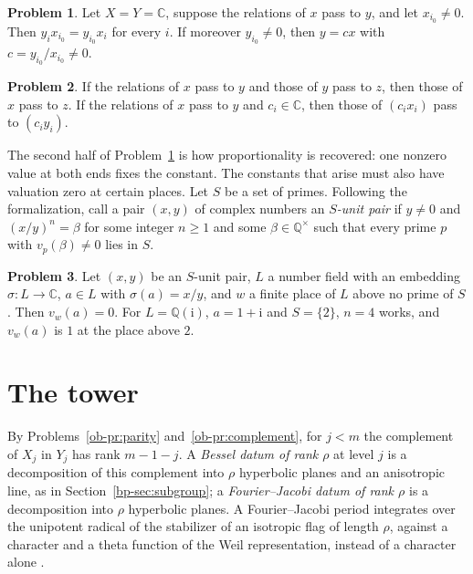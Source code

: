 \documentclass[reqno]{amsart}
\theoremstyle{definition}
\newtheorem{problem}{Problem}[section]
\theoremstyle{plain}
\theoremstyle{remark}
\newcommand{\Q}{\mathbb Q}
\newcommand{\C}{\mathbb C}
\begin{document}
\begin{problem}\label{pr:anchor}
Let \(X=Y=\C\), suppose the relations of \(x\) pass to \(y\), and let \(x_{i_0}\ne0\).  Then \(y_ix_{i_0}=y_{i_0}x_i\) for every \(i\).  If moreover \(y_{i_0}\ne0\), then \(y=cx\) with \(c=y_{i_0}/x_{i_0}\ne0\).
\end{problem}

\begin{problem}\label{pr:compose}
If the relations of \(x\) pass to \(y\) and those of \(y\) pass to \(z\), then those of \(x\) pass to \(z\).  If the relations of \(x\) pass to \(y\) and \(c_i\in\C\), then those of \((c_ix_i)\) pass to \((c_iy_i)\).
\end{problem}

The second half of Problem~\ref{pr:anchor} is how proportionality is recovered: one nonzero value at both ends fixes the constant.  The constants that arise must also have valuation zero at certain places.  Let \(S\) be a set of primes.  Following the formalization, call a pair \((x,y)\) of complex numbers an \emph{\(S\)-unit pair} if \(y\ne0\) and \((x/y)^n=\beta\) for some integer \(n\ge1\) and some \(\beta\in\Q^\times\) such that every prime \(p\) with \(v_p(\beta)\ne0\) lies in \(S\).

\begin{problem}\label{pr:unit-ratio}
Let \((x,y)\) be an \(S\)-unit pair, \(L\) a number field with an embedding \(\sigma\colon L\to\C\), \(a\in L\) with \(\sigma(a)=x/y\), and \(w\) a finite place of \(L\) above no prime of \(S\).  Then \(v_w(a)=0\).  For \(L=\Q(\mathrm i)\), \(a=1+\mathrm i\) and \(S=\{2\}\), \(n=4\) works, and \(v_w(a)\) is \(1\) at the place above \(2\).
\end{problem}

\section{The tower}\label{sec:tower}

By Problems~\ref{ob-pr:parity} and~\ref{ob-pr:complement}, for \(j<m\) the complement of \(X_j\) in \(Y_j\) has rank \(m-1-j\).  A \emph{Bessel datum of rank \(\rho\)} at level \(j\) is a decomposition of this complement into \(\rho\) hyperbolic planes and an anisotropic line, as in Section~\ref{bp-sec:subgroup}; a \emph{Fourier--Jacobi datum of rank \(\rho\)} is a decomposition into \(\rho\) hyperbolic planes.  A Fourier--Jacobi period integrates over the unipotent radical of the stabilizer of an isotropic flag of length \(\rho\), against a character and a theta function of the Weil representation, instead of a character alone \cite[\S\S12, 23]{GGP}.
\end{document}
